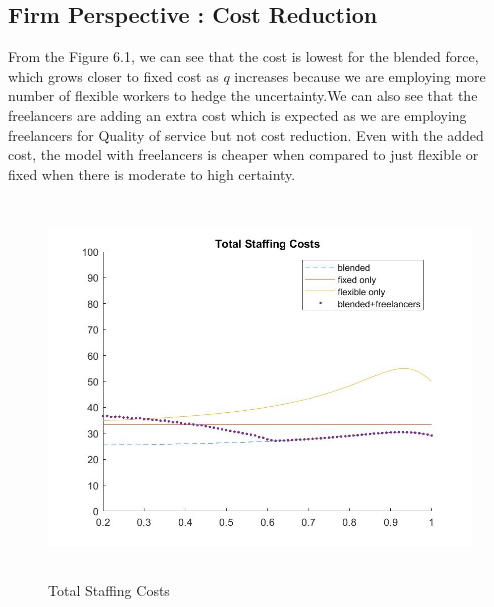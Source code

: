 \subsection{Firm Perspective : Cost Reduction}
From the Figure 6.1, we can see that the cost is lowest for the blended force, which grows closer to fixed cost as $q$ increases because we are employing more number of flexible workers to hedge the uncertainty.We can also see that the freelancers are adding an extra cost which is expected as we are employing freelancers for Quality of service but not cost reduction. Even with the added cost, the model with freelancers is cheaper when compared to just flexible or fixed when there is moderate to high certainty.
\\\begin{figure}[hbt!]
\includegraphics[height=10cm]{cost.jpg}
\caption{Total Staffing Costs}
\end{figure}
